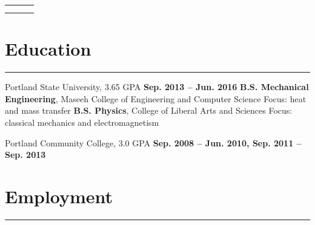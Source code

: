 

\newlength{\rcollength}\setlength{\rcollength}{3.0in}%
\begin{tabular} {
  p{}
  p{}
  p{}}
	\begin{flushleft}
		\address
	\end{flushleft}
	&
	\begin{center}
	\Large{\author}
	\end{center}
	&
	\begin{flushright}
		{\phnum}\\
 	    {\email} 	 
	\end{flushright}
\end{tabular}
\section{Education}
	\noindent\rule{\textwidth}{\hlinewidth}
	\begin{innerlist}
	\item Portland State University, 3.65 GPA	\hfill\textbf{Sep. 2013 -- Jun. 2016}
		\subitem \textbf{B.S. Mechanical Engineering}, Maseeh College of Engineering and Computer Science
		\subsubitem Focus: heat and mass transfer
		\subitem\textbf{B.S. Physics}, College of Liberal Arts and Sciences
		\subsubitem Focus: classical mechanics and electromagnetism
		\subitem 
	\item Portland Community College, 3.0 GPA	\hfill\textbf{Sep. 2008 -- Jun. 2010, Sep. 2011 -- Sep. 2013}
	\end{innerlist}
\vfill
\section{Employment}
\noindent\rule{\textwidth}{\hlinewidth}

